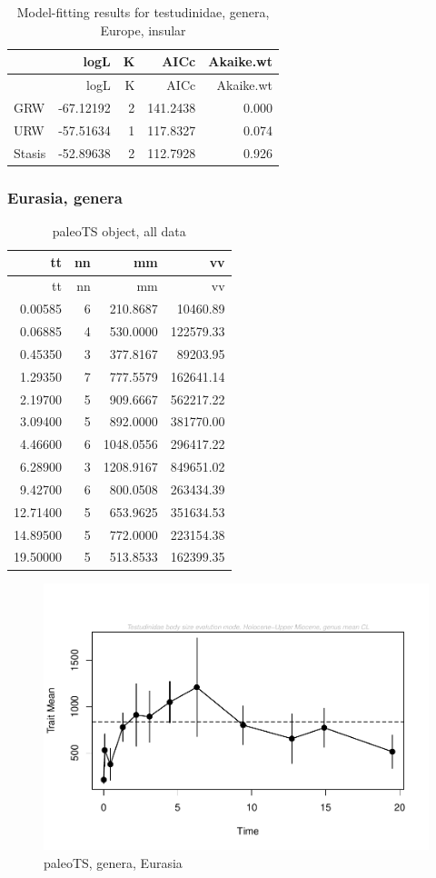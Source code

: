 \documentclass[]{article}
\begin{document}
\begin{longtable}[]{@{}lrrrr@{}}
\caption{Model-fitting results for testudinidae, genera, Europe,
insular}\tabularnewline
\toprule
& logL & K & AICc & Akaike.wt\tabularnewline
\midrule
\endfirsthead
\toprule
& logL & K & AICc & Akaike.wt\tabularnewline
\midrule
\endhead
GRW & -67.12192 & 2 & 141.2438 & 0.000\tabularnewline
URW & -57.51634 & 1 & 117.8327 & 0.074\tabularnewline
Stasis & -52.89638 & 2 & 112.7928 & 0.926\tabularnewline
\bottomrule
\end{longtable}

\newpage 

\subsubsection{Eurasia, genera}\label{eurasia-genera}

\begin{longtable}[]{@{}rrrr@{}}
\caption{paleoTS object, all data}\tabularnewline
\toprule
tt & nn & mm & vv\tabularnewline
\midrule
\endfirsthead
\toprule
tt & nn & mm & vv\tabularnewline
\midrule
\endhead
0.00585 & 6 & 210.8687 & 10460.89\tabularnewline
0.06885 & 4 & 530.0000 & 122579.33\tabularnewline
0.45350 & 3 & 377.8167 & 89203.95\tabularnewline
1.29350 & 7 & 777.5579 & 162641.14\tabularnewline
2.19700 & 5 & 909.6667 & 562217.22\tabularnewline
3.09400 & 5 & 892.0000 & 381770.00\tabularnewline
4.46600 & 6 & 1048.0556 & 296417.22\tabularnewline
6.28900 & 3 & 1208.9167 & 849651.02\tabularnewline
9.42700 & 6 & 800.0508 & 263434.39\tabularnewline
12.71400 & 5 & 653.9625 & 351634.53\tabularnewline
14.89500 & 5 & 772.0000 & 223154.38\tabularnewline
19.50000 & 5 & 513.8533 & 162399.35\tabularnewline
\bottomrule
\end{longtable}

\begin{figure}[htbp]
\centering
\includegraphics{MA_JJ_files/figure-latex/paleoTSEurasia-1.pdf}
\caption{paleoTS, genera, Eurasia}
\end{figure}
\end{document}
